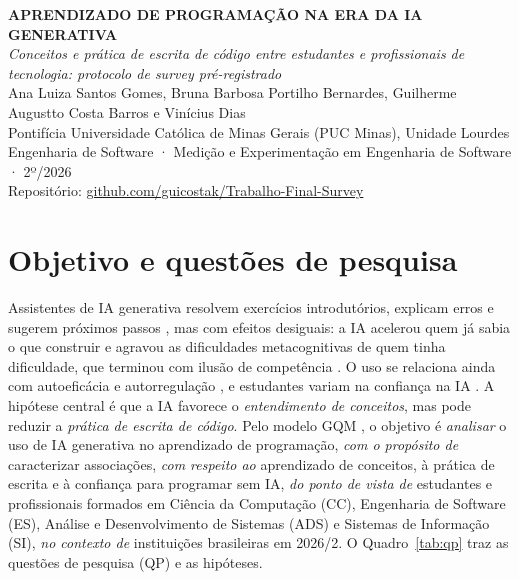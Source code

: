 \documentclass[12pt,a4paper]{article}
\begin{document}
\begin{center}
\singlespacing
{\bfseries APRENDIZADO DE PROGRAMAÇÃO NA ERA DA IA GENERATIVA}\\[0.3ex]
{\itshape Conceitos e prática de escrita de código entre estudantes e profissionais de tecnologia: protocolo de survey pré-registrado}\\[0.8ex]
Ana Luiza Santos Gomes, Bruna Barbosa Portilho Bernardes, Guilherme Augustto Costa Barros e Vinícius Dias\\
{\small Pontifícia Universidade Católica de Minas Gerais (PUC Minas), Unidade Lourdes\\
Engenharia de Software · Medição e Experimentação em Engenharia de Software · 2º/2026\\
Repositório: \href{https://github.com/guicostak/Trabalho-Final-Survey}{github.com/guicostak/Trabalho-Final-Survey}}
\end{center}
\vspace{-1ex}

\section{Objetivo e questões de pesquisa}

Assistentes de IA generativa resolvem exercícios introdutórios, explicam erros e sugerem próximos passos \citep{becker}, mas com efeitos desiguais: a IA acelerou quem já sabia o que construir e agravou as dificuldades metacognitivas de quem tinha dificuldade, que terminou com ilusão de competência \citep{prather}. O uso se relaciona ainda com autoeficácia e autorregulação \citep{margulieux}, e estudantes variam na confiança na IA \citep{amoozadeh,zastudil}. A hipótese central é que a IA favorece o \emph{entendimento de conceitos}, mas pode reduzir a \emph{prática de escrita de código}. Pelo modelo GQM \citep{basili}, o objetivo é \emph{analisar} o uso de IA generativa no aprendizado de programação, \emph{com o propósito de} caracterizar associações, \emph{com respeito ao} aprendizado de conceitos, à prática de escrita e à confiança para programar sem IA, \emph{do ponto de vista de} estudantes e profissionais formados em Ciência da Computação (CC), Engenharia de Software (ES), Análise e Desenvolvimento de Sistemas (ADS) e Sistemas de Informação (SI), \emph{no contexto de} instituições brasileiras em 2026/2. O Quadro~\ref{tab:qp} traz as questões de pesquisa (QP) e as hipóteses.
\end{document}
